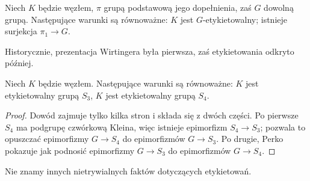\begin{proposition}
    Niech $K$ będzie węzłem, $\pi$ grupą podstawową jego dopełnienia, zaś $G$ dowolną grupą.
    Następujące warunki są równoważne: $K$ jest $G$-etykietowalny; istnieje surjekcja $\pi_1 \to G$.
\end{proposition}

Historycznie, prezentacja Wirtingera była pierwsza, zaś etykietowania odkryto później.

\begin{proposition}[Perko]
    Niech $K$ będzie węzłem.
    Następujące warunki są równoważne: $K$ jest etykietowalny grupą $S_3$, $K$ jest etykietowalny grupą $S_4$.
\end{proposition}

\begin{proof}
    Dowód zajmuje tylko kilka stron i składa się z dwóch części.
    Po pierwsze $S_4$ ma podgrupę czwórkową Kleina, więc istnieje epimorfizm $S_4 \to S_3$; pozwala to opuszczać epimorfizmy $G \to S_4$ do epimorfizmów $G \to S_3$.
    Po drugie, Perko \cite{perko1975} pokazuje jak podnosić epimorfizmy $G \to S_3$ do epimorfizmów $G \to S_4$.
\end{proof}

Nie znamy innych nietrywialnych faktów dotyczących etykietowań.

%

